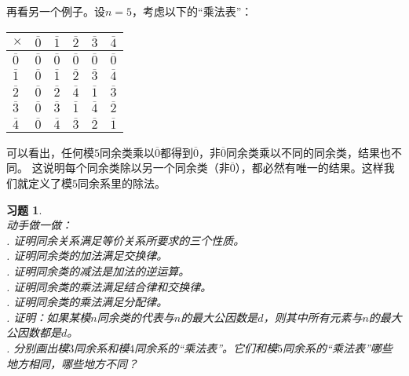 \documentclass[12pt,UTF8]{ctexbook}
\theoremstyle{definition}
\theoremstyle{plain}
\newtheorem{xt}{习题}[section]
\begin{document}
再看另一个例子。设$n=5$，考虑以下的“乘法表”：
\begin{center}
    \begin{tabular}{ | p{2em}<{\centering} | p{2em}<{\centering} | p{2em}<{\centering} | p{2em}<{\centering} | p{2em}<{\centering} | p{2em}<{\centering} | }
        \hline
            $\times$   & $\overline{0}$ & $\overline{1}$ & $\overline{2}$ & $\overline{3}$ & $\overline{4}$ \\ [0.5ex] 
        \hline
        $\overline{0}$ & $\overline{0}$ & $\overline{0}$ & $\overline{0}$ & $\overline{0}$ & $\overline{0}$ \\  
        \hline
        $\overline{1}$ & $\overline{0}$ & $\overline{1}$ & $\overline{2}$ & $\overline{3}$ & $\overline{4}$ \\
        \hline
        $\overline{2}$ & $\overline{0}$ & $\overline{2}$ & $\overline{4}$ & $\overline{1}$ & $\overline{3}$ \\
        \hline
        $\overline{3}$ & $\overline{0}$ & $\overline{3}$ & $\overline{1}$ & $\overline{4}$ & $\overline{2}$ \\
        \hline 
        $\overline{4}$ & $\overline{0}$ & $\overline{4}$ & $\overline{3}$ & $\overline{2}$ & $\overline{1}$ \\
        \hline
    \end{tabular}
\end{center}

可以看出，任何模$5$同余类乘以$\overline{0}$都得到$\overline{0}$，非$\overline{0}$同余类乘以不同的同余类，结果也不同。
这说明每个同余类除以另一个同余类（非$\overline{0}$），都必然有唯一的结果。这样我们就定义了模$5$同余系里的除法。

\begin{xt}\label{xt:3-0-0}
    \mbox{}\\
    动手做一做：\\
    . 证明同余关系满足等价关系所要求的三个性质。 \\
    . 证明同余类的加法满足交换律。 \\
    . 证明同余类的减法是加法的逆运算。\\
    . 证明同余类的乘法满足结合律和交换律。\\
    . 证明同余类的乘法满足分配律。\\
    . 证明：如果某模$n$同余类的代表与$n$的最大公因数是$d$，则其中所有元素与$n$的最大公因数都是$d$。\\
    . 分别画出模$3$同余系和模$4$同余系的“乘法表”。它们和模$5$同余系的“乘法表”哪些地方相同，哪些地方不同？
\end{xt}
\end{document}
